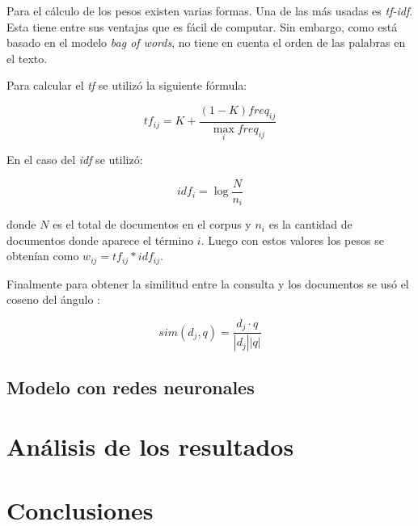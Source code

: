 \documentclass[12pt]{article}
\begin{document}
Para el cálculo de los pesos existen varias formas. Una de las más 
usadas es \textit{tf-idf}. Esta tiene entre sus ventajas que es 
fácil de computar. Sin embargo, como está basado en el modelo
\textit{bag of words}, no tiene en cuenta el orden de las palabras
en el texto.

Para calcular el \textit{tf} se utilizó la siguiente fórmula:

$$tf_{ij} = K + \frac{(1-K)freq_{ij}}{\max_{i} freq_{ij}}$$

En el caso del \textit{idf} se utilizó:

$$idf_i= \log \frac{N}{n_i}$$

donde $N$ es el total de documentos en el corpus y $n_i$ es la
cantidad de documentos donde aparece el término $i$. Luego con estos 
valores los pesos se obtenían como $w_{ij}= tf_{ij}*idf_{ij}$.

Finalmente para obtener la similitud entre la consulta y los 
documentos se usó el coseno del ángulo :

$$sim(d_{j},q) = \frac{ d_{j} \cdot q }{ |d_{j}||q| }$$


\subsection{Modelo con redes neuronales}


\section{Análisis de los resultados} 


\section{Conclusiones} %




% 

\end{document}
